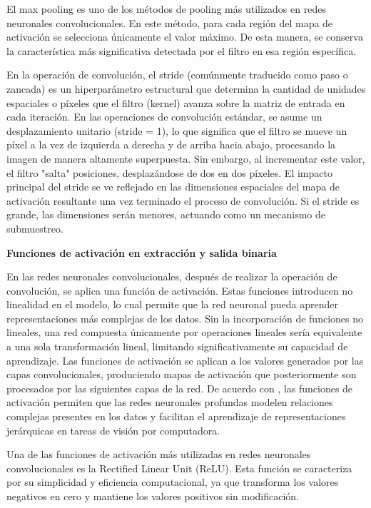 El max pooling es uno de los métodos de pooling más utilizados en redes neuronales convolucionales. En este método, para cada región del mapa de activación se selecciona únicamente el valor máximo. De esta manera, se conserva la característica más significativa detectada por el filtro en esa región específica.

En la operación de convolución, el stride (comúnmente traducido como paso o zancada) es un hiperparámetro estructural que determina la cantidad de unidades espaciales o píxeles que el filtro (kernel) avanza sobre la matriz de entrada en cada iteración.
En las operaciones de convolución estándar, se asume un desplazamiento unitario (stride = 1), lo que significa que el filtro se mueve un píxel a la vez de izquierda a derecha y de arriba hacia abajo, procesando la imagen de manera altamente superpuesta. Sin embargo, al incrementar este valor, el filtro "salta" posiciones, desplazándose de dos en dos píxeles.
El impacto principal del stride se ve reflejado en las dimensiones espaciales del mapa de activación resultante una vez terminado el proceso de convolución. Si el stride es grande, las dimensiones serán menores, actuando como un mecanismo de submuestreo\parencite{goodfellow2016deep}.

\medskip\textbf{Funciones de activación en extracción y salida binaria}

En las redes neuronales convolucionales, después de realizar la operación de convolución, se aplica una función de activación. Estas funciones introducen no linealidad en el modelo, lo cual permite que la red neuronal pueda aprender representaciones más complejas de los datos. Sin la incorporación de funciones no lineales, una red compuesta únicamente por operaciones lineales sería equivalente a una sola transformación lineal, limitando significativamente su capacidad de aprendizaje.
Las funciones de activación se aplican a los valores generados por las capas convolucionales, produciendo mapas de activación que posteriormente son procesados por las siguientes capas de la red. De acuerdo con \textcite{goodfellow2016deep}, las funciones de activación permiten que las redes neuronales profundas modelen relaciones complejas presentes en los datos y facilitan el aprendizaje de representaciones jerárquicas en tareas de visión por computadora.

Una de las funciones de activación más utilizadas en redes neuronales convolucionales es la Rectified Linear Unit (ReLU). Esta función se caracteriza por su simplicidad y eficiencia computacional, ya que transforma los valores negativos en cero y mantiene los valores positivos sin modificación.

